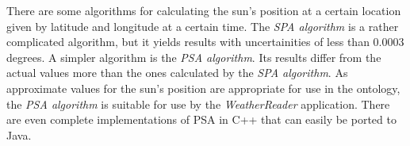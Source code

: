 There are some algorithms for calculating the sun's position at a certain location given by latitude and longitude at a certain time. The \emph{SPA algorithm} is a rather complicated algorithm, but it yields results with uncertainities of less than 0.0003 degrees. A simpler algorithm is the \emph{PSA algorithm}. Its results differ from the actual values more than the ones calculated by the \emph{SPA algorithm}. As approximate values for the sun's position are appropriate for use in the \thinkhomeweather ontology, the \emph{PSA algorithm} is suitable for use by the \emph{WeatherReader} application. There are even complete implementations of PSA in C++ that can easily be ported to Java.
